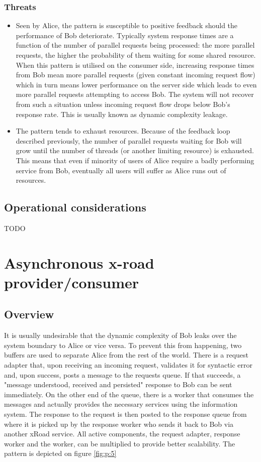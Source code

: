 \documentclass[10pt,a4paper]{article}
\begin{document}
\subsubsection{Threats}
	\begin{itemize}
		\item Seen by Alice, the pattern is susceptible to positive feedback should the performance of Bob deteriorate. Typically system response times are a function of the number of parallel requests being processed: the more parallel requests, the higher the probability of them waiting for some shared resource. When this pattern is utilised on the consumer side, increasing response times from Bob mean more parallel requests (given constant incoming request flow) which in turn means lower performance on the server side which leads to even more parallel requests attempting to access Bob. The system will not recover from such a situation unless incoming request flow drops below Bob's response rate. This is usually known as dynamic complexity leakage.
		\item The pattern tends to exhaust resources. Because of the feedback loop described previously, the number of parallel requests waiting for Bob will grow until the number of threads (or another limiting resource) is exhausted. This means that even if minority of users of Alice require a badly performing service from Bob, eventually all users will suffer as Alice runs out of resources. 
	\end{itemize} 


\subsection{Operational considerations}
TODO

\section{Asynchronous x-road provider/consumer}
\label{sec:p:5}
\subsection{Overview}
It is usually undesirable that the dynamic complexity  of Bob leaks over the system boundary to Alice or vice versa. To prevent this from happening, two buffers are used to separate Alice from the rest of the world. There is a request adapter that, upon receiving an incoming request, validates it for syntactic error and, upon success, posts a message to the requests queue. If that succeeds, a "message understood, received and persisted" response to Bob can be sent immediately. On the other end of the queue, there is a worker that consumes the messages and actually provides the necessary services using the information system. The response to the request is then posted to the response queue from where it is picked up by the response worker who sends it back to Bob via another xRoad service. All active components, the request adapter, response worker and the worker, can be multiplied to provide better scalability. The pattern is depicted on figure \ref{fig:p:5}
\end{document}
